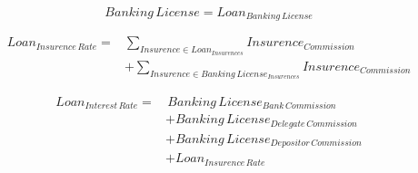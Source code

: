 \documentclass[fleqn]{article}
\begin{document}
	
	\Large
	
	\begin{equation}
		Banking \, License = Loan_{Banking \, License}
	\end{equation}
	
	\begin{equation}
		\begin{split}
			Loan_{Insurence \, Rate} =& \displaystyle\sum_{Insurence \in Loan_{Insurences}} Insurence_{Commission} \\
			&+ \displaystyle\sum_{Insurence \in Banking \, License_{Insurences}} Insurence_{Commission}
		\end{split}
	\end{equation}

	\begin{equation}
		\begin{split}
			Loan_{Interest \, Rate} =& \, Banking \, License_{Bank \, Commission} \\
			&+ Banking \, License_{Delegate \, Commission} \\
			&+ Banking \, License_{Depositor \, Commission} \\
			&+ Loan_{Insurence \, Rate}
		\end{split}
	\end{equation}
\end{document}
